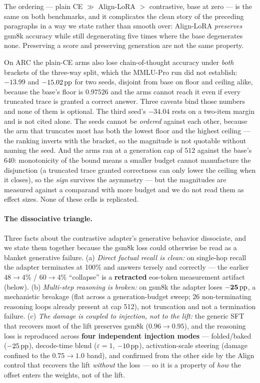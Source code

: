 The ordering --- plain CE $\gg$ Align-LoRA $>$ contrastive, base at zero --- is the
same on both benchmarks, and it complicates the clean story of the preceding
paragraphs in a way we state rather than smooth over: Align-LoRA \emph{preserves}
gsm8k accuracy while still degenerating five times where the base degenerates none.
Preserving a score and preserving generation are not the same property.

On ARC the plain-CE arms also lose chain-of-thought accuracy under \emph{both}
brackets of the three-way split, which the MMLU-Pro run did not establish: $-13.99$
and $-15.02\,\mathrm{pp}$ for two seeds, disjoint from base on floor and ceiling alike,
because the base's floor is $0.97526$ and the arms cannot reach it even if every
truncated trace is granted a correct answer. Three caveats bind those numbers and
none of them is optional. The third seed's $-34.04$ rests on a two-item margin and
is not cited alone. The seeds cannot be \emph{ordered} against each other, because
the arm that truncates most has both the lowest floor and the highest ceiling ---
the ranking inverts with the bracket, so the magnitude is not quotable without
naming the seed. And the arms ran at a generation cap of $512$ against the base's
$640$: monotonicity of the bound means a smaller budget cannot manufacture the
disjunction (a truncated trace granted correctness can only lower the ceiling when
it closes), so the \emph{sign} survives the asymmetry --- but the magnitudes are
measured against a comparand with more budget and we do not read them as effect
sizes. None of these cells is replicated.

\paragraph{The dissociative triangle.}
Three facts about the contrastive adapter's generative behavior dissociate, and we
state them together because the gsm8k loss could otherwise be read as a blanket
generative failure. (a) \emph{Direct factual recall is clean:} on single-hop recall
the adapter terminates at 100\% and answers tersely and correctly --- the earlier
$48{\rightarrow}4\%$ / $60{\rightarrow}4\%$ ``collapse'' is a \textbf{retracted}
eos-token measurement artifact (below). (b) \emph{Multi-step reasoning is broken:}
on gsm8k the adapter loses $\mathbf{-25\,\mathrm{pp}}$, a mechanistic breakage (flat across a
generation-budget sweep; 26 non-terminating reasoning loops already present at cap
512), not truncation and not a termination failure. (c) \emph{The damage is coupled
to injection, not to the lift:} the generic SFT that recovers most of the lift
preserves gsm8k ($0.96{\rightarrow}0.95$), and the reasoning loss is reproduced
across \textbf{four independent injection modes} --- folded/baked ($-25\,\mathrm{pp}$),
decode-time blend ($\varepsilon{=}1$, $-10\,\mathrm{pp}$), activation-scale steering (damage
confined to the $0.75{\rightarrow}1.0$ band), and confirmed from the other side by
the Align control that recovers the lift \emph{without} the loss --- so it is a
property of \emph{how} the offset enters the weights, not of the lift.

